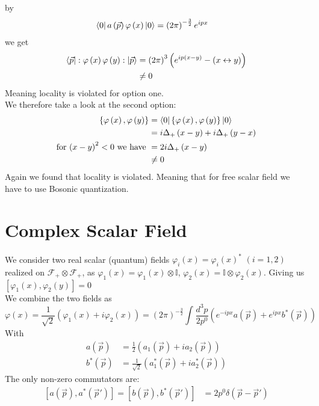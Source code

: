 \documentclass{report}
\begin{document}
by 
\begin{align*}
  \bra{0} a\left( \vec{p} \right) \varphi\left( x \right) \ket{0} &= \left( 2\pi \right) ^{-\frac{3}{2} } e^{ipx}
\end{align*}
we get
\begin{align*}
  \bra{\vec{p}} :\varphi\left( x \right) \varphi\left( y \right) : \ket{\vec{p}} &= \left( 2\pi \right) ^3 \left( e^{ip \left( x-y \right) } - \left( x \leftrightarrow y \right)  \right)  \\
  &\neq 0
\end{align*}
Meaning locality is violated for option one.\\
We therefore take a look at the second option:
\begin{align*}
  \left\{ \varphi\left( x \right) , \varphi\left( y \right)  \right\} &= \bra{0} \left\{ \varphi\left( x \right) , \varphi\left( y \right)  \right\} \ket{0}  \\
  &= i \Delta_+\left( x-y \right) + i \Delta_+\left( y-x \right)  \\
  \text{for $\left( x-y \right) ^2 < 0$ we have   }&= 2i \Delta_+\left( x-y \right)  \\
                                                   &\neq 0
\end{align*}
Again we found that locality is violated. Meaning that for free scalar field we have to use Bosonic quantization.
\section{Complex Scalar Field}
We consider two real scalar (quantum) fields $\varphi_i\left( x \right) = \varphi_i\left( x \right) ^{*} $ $\left( i = 1,2 \right) $ realized on $\mathcal{F} _+ \otimes  \mathcal{F} _+$, as $\varphi_1\left( x \right) = \varphi_1\left( x \right) \otimes \mathbb{I}$, $\varphi_2\left( x \right) = \mathbb{I} \otimes  \varphi_2\left( x \right) $. Giving us $\left[ \varphi_1\left( x \right) , \varphi_2 \left( y \right)  \right] = 0$ \\
We combine the two fields as
\[
\varphi\left( x \right) = \frac{1}{\sqrt{2} } \left( \varphi_1\left( x \right) + i \varphi_2\left( x \right)  \right) 
= \left( 2\pi \right) ^{-\frac{3}{2} }  \int_{}^{} \frac{d^3p}{2p^{0} } \left( e^{-ipx} a\left( \vec{p} \right) + e^{ipx} b^{*} \left( \vec{p} \right)  \right)  
\] 
With 
\begin{align*}
  a\left( \vec{p} \right) &= \frac{1}{2} \left( a_1\left( \vec{p} \right) + i a_2\left( \vec{p} \right)  \right)  \\
  b^{*} \left( \vec{p} \right) &= \frac{1}{\sqrt{2} } \left( a_1^{*} \left( \vec{p} \right) + i a_2^{*} \left( \vec{p} \right)  \right) 
\end{align*}
The only non-zero commutators are:
\begin{align*}
  \left[ a\left( \vec{p} \right) , a^{*} \left( \vec{p}' \right)  \right] = \left[ b\left( \vec{p} \right) , b^{*} \left( \vec{p}' \right)  \right] &= 2 p^{0} \delta\left( \vec{p} - \vec{p}' \right) 
\end{align*}
\end{document}
